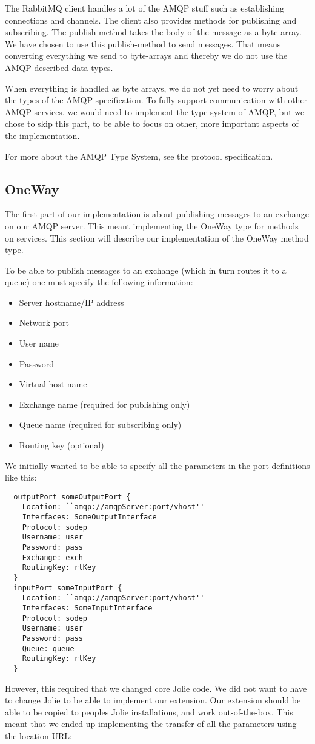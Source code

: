 The RabbitMQ client handles a lot of the AMQP stuff such as establishing connections and channels. The client also provides methods for publishing and subscribing. The publish method takes the body of the message as a byte-array. We have chosen to use this publish-method to send messages. That means converting everything we send to byte-arrays and thereby we do not use the AMQP described data types.

When everything is handled as byte arrays, we do not yet need to worry about the types of the AMQP specification. To fully support communication with other AMQP services, we would need to implement the type-system of AMQP, but we chose to skip this part, to be able to focus on other, more important aspects of the implementation.

For more about the AMQP Type System, see the protocol specification\cite{AmqpTypes}.

\subsection{OneWay}
The first part of our implementation is about publishing messages to an exchange on our AMQP server. This meant implementing the OneWay type for methods on services. This section will describe our implementation of the OneWay method type.

To be able to publish messages to an exchange (which in turn routes it to a queue) one must specify the following information:
\begin{itemize}
\item Server hostname/IP address
\item Network port
\item User name
\item Password
\item Virtual host name
\item Exchange name (required for publishing only)
\item Queue name (required for subscribing only)
\item Routing key (optional)
\end{itemize}

We initially wanted to be able to specify all the parameters in the port definitions like this:

\begin{lstlisting}
  outputPort someOutputPort {
    Location: ``amqp://amqpServer:port/vhost''
    Interfaces: SomeOutputInterface
    Protocol: sodep
    Username: user
    Password: pass
    Exchange: exch
    RoutingKey: rtKey
  }
  inputPort someInputPort {
    Location: ``amqp://amqpServer:port/vhost''
    Interfaces: SomeInputInterface
    Protocol: sodep
    Username: user
    Password: pass
    Queue: queue
    RoutingKey: rtKey
  }
\end{lstlisting}
However, this required that we changed core Jolie code. We did not want to have to change Jolie to be able to implement our extension. Our extension should be able to be copied to peoples Jolie installations, and work out-of-the-box. This meant that we ended up implementing the transfer of all the parameters using the location URL:

